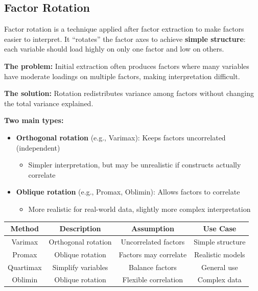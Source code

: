 \documentclass[
]{article}
\begin{document}
\subsection{Factor Rotation}

Factor rotation is a technique applied after factor extraction to make
factors easier to interpret. It ``rotates'' the factor axes to achieve
\textbf{simple structure}: each variable should load highly on only one
factor and low on others.

\textbf{The problem:} Initial extraction often produces factors where
many variables have moderate loadings on multiple factors, making
interpretation difficult.

\textbf{The solution:} Rotation redistributes variance among factors
without changing the total variance explained.

\textbf{Two main types:}

\begin{itemize}
\item
  \textbf{Orthogonal rotation} (e.g., Varimax): Keeps factors
  uncorrelated (independent)

  \begin{itemize}
  \item
    Simpler interpretation, but may be unrealistic if constructs
    actually correlate
  \end{itemize}
\item
  \textbf{Oblique rotation} (e.g., Promax, Oblimin): Allows factors to
  correlate

  \begin{itemize}
  \item
    More realistic for real-world data, slightly more complex
    interpretation
  \end{itemize}
\end{itemize}

{\def\LTcaptype{none} %
\begin{longtable}[]{@{}cccc@{}}
\toprule\noalign{}
\textbf{Method} & \textbf{Description} & \textbf{Assumption} &
\textbf{Use Case} \\
\midrule\noalign{}
\endhead
\bottomrule\noalign{}
\endlastfoot
Varimax & Orthogonal rotation & Uncorrelated factors & Simple
structure \\
Promax & Oblique rotation & Factors may correlate & Realistic models \\
Quartimax & Simplify variables & Balance factors & General use \\
Oblimin & Oblique rotation & Flexible correlation & Complex data \\
\end{longtable}
}
\end{document}
